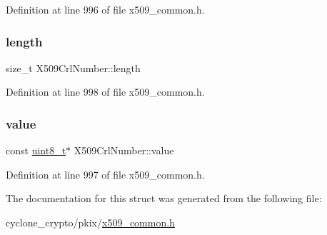 Definition at line 996 of file x509\+\_\+common.\+h.

\mbox{\label{structX509CrlNumber_a356c19fbf1a7212c3981b771f1288214}} 
\subsubsection{\texorpdfstring{length}{length}}
{\footnotesize\ttfamily size\+\_\+t X509\+Crl\+Number\+::length}



Definition at line 998 of file x509\+\_\+common.\+h.

\mbox{\label{structX509CrlNumber_a2bdf0fce19a08b65b89b12adb43e4d96}} 
\subsubsection{\texorpdfstring{value}{value}}
{\footnotesize\ttfamily const \hyperlink{stdint_8h_aba7bc1797add20fe3efdf37ced1182c5}{uint8\+\_\+t}$\ast$ X509\+Crl\+Number\+::value}



Definition at line 997 of file x509\+\_\+common.\+h.



The documentation for this struct was generated from the following file\+:\begin{DoxyCompactItemize}
\item 
cyclone\+\_\+crypto/pkix/\hyperlink{pkix_2x509__common_8h}{x509\+\_\+common.\+h}\end{DoxyCompactItemize}
